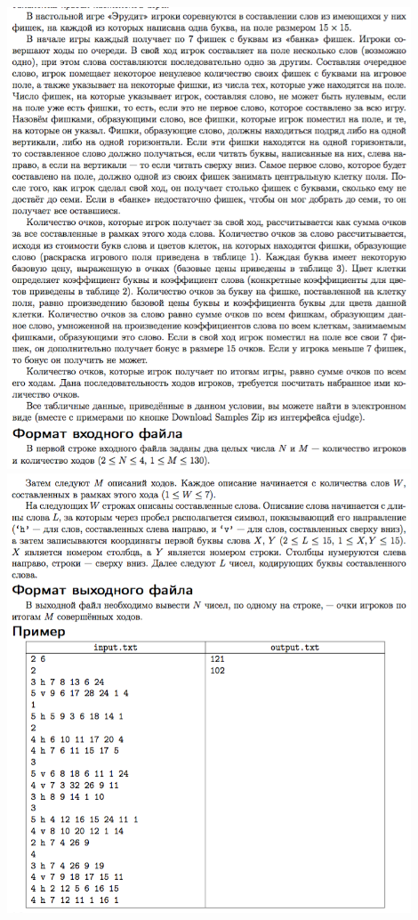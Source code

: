 \documentclass[a4paper,12pt]{article}
\begin{document}
\begin{center}
\includegraphics[width=0.9\textwidth]{OC_Eurasia/12_1.png}\\ [1cm]
\includegraphics[width=0.9\textwidth]{OC_Eurasia/12_2.png}\\ [1cm]
\end{center}
\end{document}
